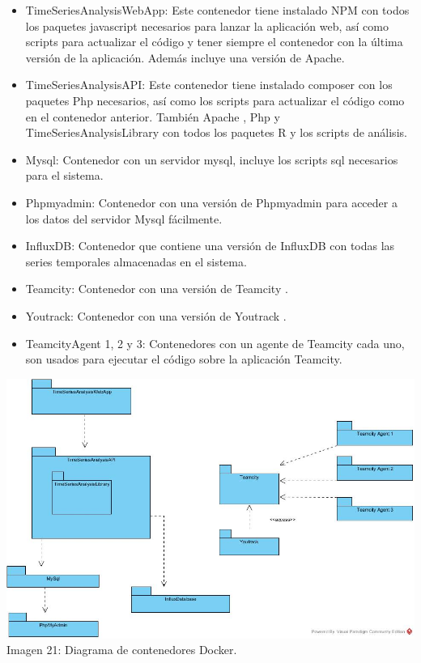 \documentclass[14pt]{extarticle}
\theoremstyle{definition}
\theoremstyle{remark}
\begin{document}
\begin{itemize}
	\item TimeSeriesAnalysisWebApp: Este contenedor tiene instalado NPM \citep{wiki:npm} con todos los paquetes javascript necesarios para lanzar la aplicación web, así como scripts para actualizar el código y tener siempre el contenedor con la última versión de la aplicación. Además incluye una versión de Apache.
	\item TimeSeriesAnalysisAPI: Este contenedor tiene instalado composer \citep{web:composer} con los paquetes Php necesarios, así como los scripts para actualizar el código como en el contenedor anterior. También Apache \citep{wiki:apache}, Php y TimeSeriesAnalysisLibrary con todos los paquetes R y los scripts de análisis.
	\item Mysql: Contenedor con un servidor mysql, incluye los scripts sql necesarios para el sistema.
	\item Phpmyadmin: Contenedor con una versión de Phpmyadmin \citep{wiki:phpmyadmin} para acceder a los datos del servidor Mysql fácilmente.
	\item InfluxDB: Contenedor que contiene una versión de InfluxDB \citep{web:influxdb} con todas las series temporales almacenadas en el sistema.
	\item Teamcity: Contenedor con una versión de Teamcity \citep{web:teamcity}.
	\item Youtrack: Contenedor con una versión de Youtrack \citep{web:youtrack}.
	\item TeamcityAgent 1, 2 y 3: Contenedores con un agente de Teamcity cada uno, son usados para ejecutar el código sobre la aplicación Teamcity.
\end{itemize}

\begin{center}
\includegraphics[scale=0.55]{DockerContainers.jpg}
\\Imagen 21: Diagrama de contenedores Docker.
\end{center}
\end{document}
